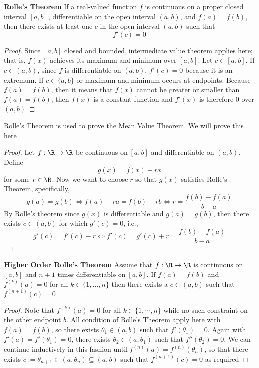 \documentclass[11pt]{article}
\begin{document}
\begin{theorem*}
  \textbf{Rolle's Theorem} If a real-valued function $f$ is continuous on a proper closed interval $[a, b]$, differentiable on the open interval $(a, b)$, and $f(a) = f(b)$, then there exists at least one $c$ in the open interval $(a, b)$ such that
  \[
    f'(c) = 0
  \]
  \begin{proof}
    Since $[a, b]$ closed and bounded, intermediate value theorem applies here; that is, $f(x)$ achieves its maximum and minimum over $[a,b]$. Let $c\in[a,b]$. If $c\in(a,b)$, since $f$ is differentiable on $(a,b)$, $f'(c) = 0$ because it is an extremum. If $c\in \{ a, b\}$ or maximum and minimum occurs at endpoints. Because $f(a) = f(b)$, then it means that $f(x)$ cannot be greater or smaller than $f(a) = f(b)$, then $f(x)$ is a constant function and $f'(x)$ is therefore 0 over $(a,b)$
  \end{proof}
  \begin{rem}
    Rolle's Theorem is used to prove the Mean Value Theorem. We will prove this here
  \end{rem}
  \begin{proof}
    Let $f: \R \to \R$ be continuous on $[a,b]$ and differentiable on $(a,b)$. Define
    \[
      g(x) = f(x) - rx
    \]
    for some $r\in \R$. Now we want to choose $r$ so that $g(x)$ satisfies Rolle's Theorem, specifically,
    \[
      g(a) = g(b) \iff f(a) - ra = f(b) - rb \iff r = \frac{f(b) - f(a)}{b-a}
    \]
    By Rolle's theorem since $g(x)$ is differentiable and $g(a) = g(b)$, then there exists $c\in (a,b)$ for which $g'(c) = 0$, i.e.,
    \[
      g'(c) = f'(c) - r \iff f'(c) = g'(c) + r = \frac{f(b) - f(a)}{b-a}
    \]
  \end{proof}

\end{theorem*}


\begin{theorem*}
  \label{Higher Order Rolle's Theorem} \textbf{Higher Order Rolle's Theorem} Assume that $f: \R \rightarrow \R$ is continuous on $[a,b]$ and $n+1$ times differentiable on $[a,b]$. If $f(a) = f(b)$ and $f^{(k)}(a) = 0$ for all $k\in \{ 1, \dots, n\}$ then there exists a $c\in (a,b)$ such that $f^{(n+1)}(c) = 0$
  \begin{proof}
    Note that $f^{(k)}(a) = 0$ for all $k\in \{ 1, \cdots, n\}$ while no such constraint on the other endpoint $b$. All condition of Rolle's Theorem apply here with $f(a) = f(b)$, so there exists $\theta_1 \in (a,b)$ such that $f'(\theta_1) = 0$. Again with $f'(a) = f'(\theta_1) = 0$, there exists $\theta_2 \in (a, \theta_1)$ such that $f''(\theta_2) = 0$. We can continue inductively in this fashion until $f^{(n)}(a) = f^{(n)}(\theta_n)$, so that there exists $c := \theta_{n+1} \in (a, \theta_n) \subseteq (a,b)$ such that $f^{(n+1)}(c) = 0$ as required
  \end{proof}
\end{theorem*}
\end{document}
